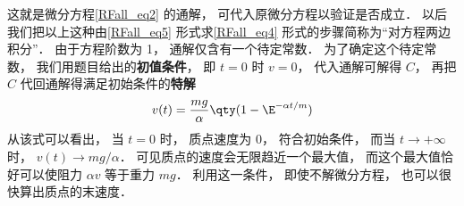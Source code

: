 这就是微分方程\autoref{RFall_eq2} 的通解， 可代入原微分方程以验证是否成立． 以后我们把以上这种由\autoref{RFall_eq5} 形式求\autoref{RFall_eq4} 形式的步骤简称为“对方程两边积分”． 由于方程阶数为 1， 通解仅含有一个待定常数． 为了确定这个待定常数， 我们用题目给出的\textbf{初值条件}， 即 $t = 0$ 时 $v = 0$， 代入通解可解得 $C$， 再把 $C$ 代回通解得满足初始条件的\textbf{特解}
\begin{equation}
v(t) = \frac{mg}{\alpha} \qty( 1- \E^{-\alpha t/m} )
\end{equation}
从该式可以看出， 当 $t = 0$ 时， 质点速度为 0， 符合初始条件， 而当 $t\to +\infty$ 时， $ v(t) \to mg/\alpha$． 可见质点的速度会无限趋近一个最大值， 而这个最大值恰好可以使阻力 $\alpha v$ 等于重力 $mg$． 利用这一条件， 即使不解微分方程， 也可以很快算出质点的末速度．

